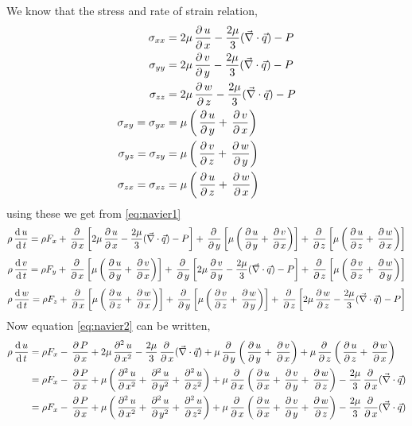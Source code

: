 \documentclass[../main-sheet.tex]{subfiles}
\begin{document}
\begin{soln}
We know that the stress and rate of strain relation,
\begin{align*}
    \sigma_{xx}&=2\mu\,\frac{\partial\, u}{\partial\, x}-\frac{2\mu}{3}(\vec{\nabla}\cdot\vec{q})-P\\
    \sigma_{yy}&=2\mu\,\frac{\partial\, v}{\partial\, y}-\frac{2\mu}{3}(\vec{\nabla}\cdot\vec{q})-P\\
    \sigma_{zz}&=2\mu\,\frac{\partial\, w}{\partial\, z}-\frac{2\mu}{3}(\vec{\nabla}\cdot\vec{q})-P\\
    \sigma_{xy}=\sigma_{yx}&=\mu\left( \,\frac{\partial\, u}{\partial\, y}+\,\frac{\partial\, v}{\partial\, x} \right)\\
    \sigma_{yz}=\sigma_{zy}&=\mu\left( \,\frac{\partial\, v}{\partial\, z}+\,\frac{\partial\, w}{\partial\, y} \right)\\
    \sigma_{zx}=\sigma_{xz}&=\mu\left( \,\frac{\partial\, u}{\partial\, z}+\,\frac{\partial\, w}{\partial\, x} \right)
\end{align*}
using these we get from \eqref{eq:navier1}
\begin{equation}
    \rho\,\frac{\mathrm{d}\,u}{\mathrm{d}\,t}=\rho F_x+\,\frac{\partial\, }{\partial\, x}\left[ 2\mu\,\frac{\partial\, u}{\partial\, x}-\frac{2\mu}{3}(\vec{\nabla}\cdot\vec{q})-P \right]+\,\frac{\partial\, }{\partial\, y}\left[ \mu\left( \,\frac{\partial\, u}{\partial\, y}+\,\frac{\partial\, v}{\partial\, x} \right) \right]+\,\frac{\partial\, }{\partial\, z}\left[ \mu\left( \,\frac{\partial\, u}{\partial\, z}+\,\frac{\partial\, w}{\partial\, x} \right) \right]
    \label{eq:navier2}
\end{equation}
\begin{equation}
    \rho\,\frac{\mathrm{d}\,v}{\mathrm{d}\,t}=\rho F_y+\,\frac{\partial\, }{\partial\, x}\left[\mu\left( \,\frac{\partial\, u}{\partial\, y}+\,\frac{\partial\, v}{\partial\, x} \right)\right]+\,\frac{\partial\, }{\partial\, y}\left[2\mu\,\frac{\partial\, v}{\partial\, y}-\frac{2\mu}{3}(\vec{\nabla}\cdot\vec{q})-P\right]+\,\frac{\partial\, }{\partial\, z}\left[\mu\left( \,\frac{\partial\, v}{\partial\, z}+\,\frac{\partial\, w}{\partial\, y} \right)\right]
    \label{eq:navier3}
\end{equation}
\begin{equation}
    \rho\,\frac{\mathrm{d}\,w}{\mathrm{d}\,t}=\rho F_z+\,\frac{\partial\, }{\partial\, x}\left[\mu\left( \,\frac{\partial\, u}{\partial\, z}+\,\frac{\partial\, w}{\partial\, x} \right)\right]+\,\frac{\partial\, }{\partial\, y}\left[\mu\left( \,\frac{\partial\, v}{\partial\, z}+\,\frac{\partial\, w}{\partial\, y} \right)\right]+\,\frac{\partial\, }{\partial\, z}\left[2\mu\,\frac{\partial\, w}{\partial\, z}-\frac{2\mu}{3}(\vec{\nabla}\cdot\vec{q})-P\right]
    \label{eq:navier4}
\end{equation}
Now equation \eqref{eq:navier2} can be written,
\begin{align*}
    \rho\ddt{u}&=\rho F_x-\pardx{P}+2\mu\parxn{u}{2}-\frac{2\mu}{3}\pardx{}(\vec{\nabla}\cdot \vec{q})+\mu\pardy{}\left( \pardy{u}+\pardx{v} \right)+\mu\pardz{}\left( \pardz{u}+\pardx{w}  \right)\\
    &=\rho F_x-\pardx{P}+\mu\left(\parxn{u}{2}+\paryn{u}{2}+\parzn{u}{2}\right) +\mu\pardx{}\left( \pardx{u}+\pardy{v}+\pardz{w} \right)-\frac{2\mu}{3}\pardx{}(\vec{\nabla}\cdot \vec{q})\\
    &=\rho F_x-\pardx{P}+\mu\left(\parxn{u}{2}+\paryn{u}{2}+\parzn{u}{2}\right) +\mu\pardx{}\left( \pardx{u}+\pardy{v}+\pardz{w} \right)-\frac{2\mu}{3}\pardx{}(\vec{\nabla}\cdot \vec{q})\\

\end{align*}
\end{soln}
\end{document}
